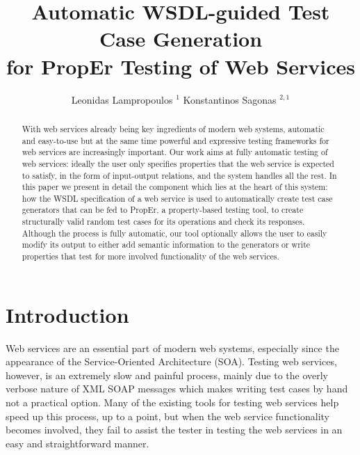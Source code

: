 \documentclass[copyright]{eptcs}
\title{Automatic WSDL-guided Test Case Generation\\
       for PropEr Testing of Web Services}
\author{Leonidas Lampropoulos $^{1}$ \hspace*{2em} Konstantinos Sagonas $^{2,1}$
\institute{%
  $^{1}$ School of Electrical and Computer Engineering,
  National Technical University of Athens, Greece\\
  $^{2}$ Department of Information Technology, Uppsala University, Sweden
}
}
\begin{document}
\maketitle

\begin{abstract}
With web services already being key ingredients of modern web systems,
automatic and easy-to-use but at the same time powerful and expressive
testing frameworks for web services are increasingly important. Our
work aims at fully automatic testing of web services: ideally the user
only specifies properties that the web service is expected to satisfy,
in the form of input-output relations, and the system handles all the
rest. In this paper we present in detail the component which lies at
the heart of this system: how the WSDL specification of a web service
is used to automatically create test case generators that can be fed
to PropEr, a property-based testing tool, to create structurally valid
random test cases for its operations and check its responses. Although
the process is fully automatic, our tool optionally allows the user to
easily modify its output to either add semantic information to the
generators or write properties that test for more involved
functionality of the web services.
\end{abstract}


\section{Introduction} \label{sec:intro}


Web services are an essential part of modern web systems, especially
since the appearance of the Service-Oriented Architecture (SOA).
Testing web services, however, is an extremely slow and painful
process, mainly due to the overly verbose nature of XML SOAP messages
which makes writing test cases by hand not a practical option. Many of
the existing tools for testing web services help speed up this
process, up to a point, but when the web service functionality becomes
involved, they fail to assist the tester in testing the web services
in an easy and straightforward manner.

\end{document}
